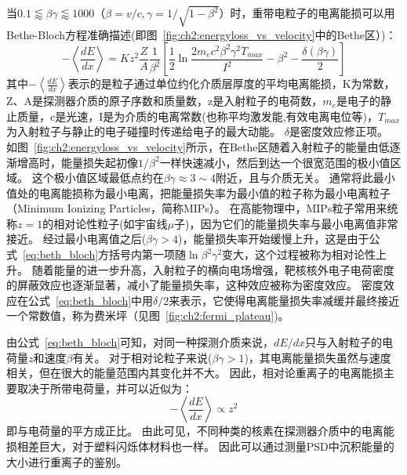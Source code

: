 当$0.1\lessapprox\beta\gamma\lessapprox1000$（$\beta=v/c,\gamma=1/\sqrt{1-{\beta}^2}$）时，重带电粒子的电离能损可以用Bethe-Bloch方程准确描述(即图~\ref{fig:ch2:energyloss_vs_velocity}中的Bethe区）)：
\begin{equation}\label{eq:beth_bloch}
-\left\langle\frac{dE}{dx}\right\rangle = Kz^2\frac{Z}{A}\frac{1}{{\beta}^2}
\left[\frac{1}{2}\ln\frac{2m_ec^2{\beta}^2{\gamma}^2T_{max}}{I^2}-{\beta}^2-\frac{\delta(\beta\gamma)}{2}\right]
\end{equation}
其中$-\left\langle\frac{dE}{dx}\right\rangle$表示的是粒子通过单位约化介质层厚度的平均电离能损，K为常数，Z、A是探测器介质的原子序数和质量数，z是入射粒子的电荷数，$m_e$是电子的静止质量，c是光速，I是为介质的电离常数(也称平均激发能,有效电离电位等)，$T_{max}$为入射粒子与静止的电子碰撞时传递给电子的最大动能。
$\delta$是密度效应修正项。
如图~\ref{fig:ch2:energyloss_vs_velocity}所示，在Bethe区随着入射粒子的能量由低逐渐增高时，能量损失起初像$1/{\beta}^2$一样快速减小，然后到达一个很宽范围的极小值区域。
这个极小值区域最低点约在$\beta\gamma\approx3\sim4$附近，且与介质无关。
通常将此最小值处的电离能损称为最小电离，把能量损失率为最小值的粒子称为最小电离粒子（Minimum Ionizing Particles，简称MIPs）。
在高能物理中，MIPs粒子常用来统称$z=1$的相对论性粒子(如宇宙线$\mu$子)，因为它们的能量损失率与最小电离值非常接近。
经过最小电离值之后($\beta\gamma>4$)，能量损失率开始缓慢上升，这是由于公式~\ref{eq:beth_bloch}方括号内第一项随$\ln{\beta}^2{\gamma}^2$变大，这个过程被称为相对论性上升。
随着能量的进一步升高，入射粒子的横向电场增强，靶核核外电子电荷密度的屏蔽效应也逐渐显著，减小了能量损失率，这种效应被称为密度效应。
密度效应在公式~\ref{eq:beth_bloch}中用$\delta/2$来表示，它使得电离能量损失率减缓并最终接近一个常数值，称为费米坪（见图~\ref{fig:ch2:fermi_plateau})。



由公式~\ref{eq:beth_bloch}可知，对同一种探测介质来说，$dE/dx$只与入射粒子的电荷量$z$和速度$\beta$有关。
对于相对论粒子来说($\beta\gamma>1$)，其电离能量损失虽然与速度相关，但在很大的能量范围内其变化并不大。
因此，相对论重离子的电离能损主要取决于所带电荷量，并可以近似为：
\begin{equation}
-\left\langle\frac{dE}{dx}\right\rangle \propto z^2
\end{equation}
即与电荷量的平方成正比。
由此可见，不同种类的核素在探测器介质中的电离能损相差巨大，对于塑料闪烁体材料也一样。
因此可以通过测量PSD中沉积能量的大小进行重离子的鉴别。

